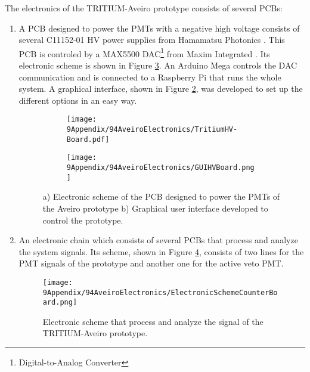 The electronics of the TRITIUM-Aveiro prototype consists of several PCBs:
\begin{enumerate}
\item{} A PCB designed to power the PMTs with a negative high voltage consists of several C11152-01  HV power supplies from Hamamatsu Photonics \cite{PowerSupplyAveiroDataSheet}. This PCB is controled by a MAX5500 DAC\footnote{Digital-to-Analog Converter} from Maxim Integrated \cite{MAX5500DataSheet}. Its electronic scheme is shown in Figure \ref{fig:HVElectronicAveiro}.  An Arduino Mega controls the DAC communication and is connected to a Raspberry Pi that runs the whole system. A graphical interface, shown in Figure \ref{subfig:GUI}, was developed to set up the different options in an easy way.

\begin{figure}
\centering
    \begin{subfigure}[b]{0.8\textwidth}
    \centering
    \texttt{[image: 9Appendix/94AveiroElectronics/TritiumHV-Board.pdf]}  
    \caption{\label{subfig:ElectronicSchemeHVBoard}}
    \end{subfigure}
    \hfill
    \begin{subfigure}[b]{0.6\textwidth}
    \centering
    \texttt{[image: 9Appendix/94AveiroElectronics/GUIHVBoard.png]}  
    \caption{\label{subfig:GUI}}
    \end{subfigure}
 \caption{a) Electronic scheme of the PCB designed to power the PMTs of the Aveiro prototype b) Graphical user interface developed to control the prototype.}
 \label{fig:HVElectronicAveiro}
\end{figure}

\item{} An electronic chain which consists of several PCBs that process and analyze the system signals. Its scheme, shown in Figure \ref{fig:ElectronicSchemCounterBoard}, consists of two lines for the PMT signals of the prototype and another one for the active veto PMT.

\begin{figure}[h]
\centering
\texttt{[image: 9Appendix/94AveiroElectronics/ElectronicSchemeCounterBoard.png]}
\caption{Electronic scheme that process and analyze the signal of the TRITIUM-Aveiro prototype. \label{fig:ElectronicSchemCounterBoard}}
\end{figure}


\end{enumerate}
